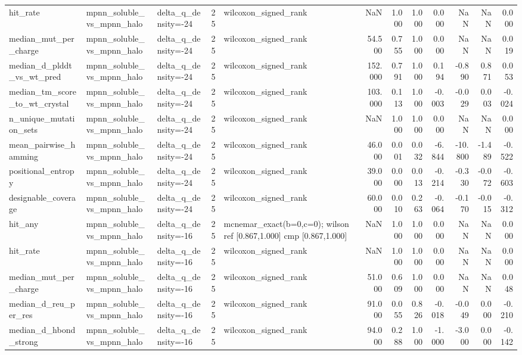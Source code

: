 \begin{table}
{\begin{tabular}{lllrlrrrrrrr}
hit\_rate & mpnn\_soluble\_vs\_mpnn\_halo & delta\_q\_density=-24 & 25 & wilcoxon\_signed\_rank & NaN & 1.000 & 1.000 & 0.000 & NaN & NaN & 0.000 \\
median\_mut\_per\_charge & mpnn\_soluble\_vs\_mpnn\_halo & delta\_q\_density=-24 & 25 & wilcoxon\_signed\_rank & 54.500 & 0.755 & 1.000 & 0.000 & NaN & NaN & 0.019 \\
median\_d\_plddt\_vs\_wt\_pred & mpnn\_soluble\_vs\_mpnn\_halo & delta\_q\_density=-24 & 25 & wilcoxon\_signed\_rank & 152.000 & 0.791 & 1.000 & 0.194 & -0.890 & 0.871 & 0.053 \\
median\_tm\_score\_to\_wt\_crystal & mpnn\_soluble\_vs\_mpnn\_halo & delta\_q\_density=-24 & 25 & wilcoxon\_signed\_rank & 103.000 & 0.113 & 1.000 & -0.003 & -0.029 & 0.003 & -0.024 \\
n\_unique\_mutation\_sets & mpnn\_soluble\_vs\_mpnn\_halo & delta\_q\_density=-24 & 25 & wilcoxon\_signed\_rank & NaN & 1.000 & 1.000 & 0.000 & NaN & NaN & 0.000 \\
mean\_pairwise\_hamming & mpnn\_soluble\_vs\_mpnn\_halo & delta\_q\_density=-24 & 25 & wilcoxon\_signed\_rank & 46.000 & 0.001 & 0.032 & -6.844 & -10.800 & -1.489 & -0.522 \\
positional\_entropy & mpnn\_soluble\_vs\_mpnn\_halo & delta\_q\_density=-24 & 25 & wilcoxon\_signed\_rank & 39.000 & 0.000 & 0.013 & -0.214 & -0.330 & -0.072 & -0.603 \\
designable\_coverage & mpnn\_soluble\_vs\_mpnn\_halo & delta\_q\_density=-24 & 25 & wilcoxon\_signed\_rank & 60.000 & 0.010 & 0.263 & -0.064 & -0.170 & -0.015 & -0.312 \\
hit\_any & mpnn\_soluble\_vs\_mpnn\_halo & delta\_q\_density=-16 & 25 & mcnemar\_exact(b=0,c=0); wilson ref [0.867,1.000] cmp [0.867,1.000] & NaN & 1.000 & 1.000 & 0.000 & NaN & NaN & 0.000 \\
hit\_rate & mpnn\_soluble\_vs\_mpnn\_halo & delta\_q\_density=-16 & 25 & wilcoxon\_signed\_rank & NaN & 1.000 & 1.000 & 0.000 & NaN & NaN & 0.000 \\
median\_mut\_per\_charge & mpnn\_soluble\_vs\_mpnn\_halo & delta\_q\_density=-16 & 25 & wilcoxon\_signed\_rank & 51.000 & 0.609 & 1.000 & 0.000 & NaN & NaN & 0.048 \\
median\_d\_reu\_per\_res & mpnn\_soluble\_vs\_mpnn\_halo & delta\_q\_density=-16 & 25 & wilcoxon\_signed\_rank & 91.000 & 0.055 & 0.826 & -0.018 & -0.049 & 0.000 & -0.210 \\
median\_d\_hbond\_strong & mpnn\_soluble\_vs\_mpnn\_halo & delta\_q\_density=-16 & 25 & wilcoxon\_signed\_rank & 94.000 & 0.288 & 1.000 & -1.000 & -3.000 & 0.000 & -0.142 \\

\end{tabular}}
\end{table}
